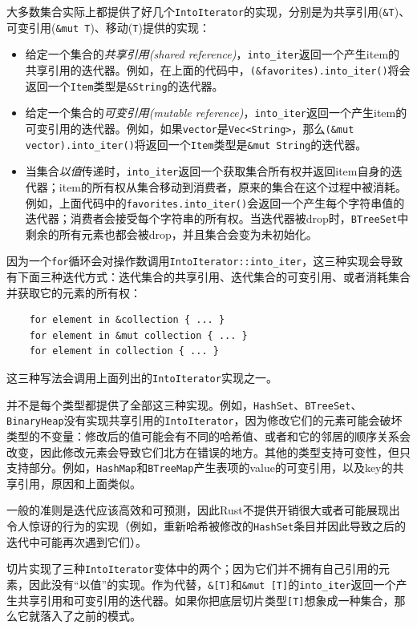 大多数集合实际上都提供了好几个\texttt{IntoIterator}的实现，分别是为共享引用(\texttt{\&T})、可变引用(\texttt{\&mut T})、移动(\texttt{T})提供的实现：
\begin{itemize}
    \item 给定一个集合的\emph{共享引用(shared reference)}，\texttt{into\_iter}返回一个产生item的共享引用的迭代器。例如，在上面的代码中，\texttt{(\&favorites).into\_iter()}将会返回一个\texttt{Item}类型是\texttt{\&String}的迭代器。
    \item 给定一个集合的\emph{可变引用(mutable reference)}，\texttt{into\_iter}返回一个产生item的可变引用的迭代器。例如，如果\texttt{vector}是\texttt{Vec<String>}，那么\texttt{(\&mut vector).into\_iter()}将返回一个\texttt{Item}类型是\texttt{\&mut String}的迭代器。
    \item 当集合\emph{以值}传递时，\texttt{into\_iter}返回一个获取集合所有权并返回item自身的迭代器；item的所有权从集合移动到消费者，原来的集合在这个过程中被消耗。例如，上面代码中的\texttt{favorites.into\_iter()}会返回一个产生每个字符串值的迭代器；消费者会接受每个字符串的所有权。当迭代器被drop时，\texttt{BTreeSet}中剩余的所有元素也都会被drop，并且集合会变为未初始化。
\end{itemize}

因为一个\texttt{for}循环会对操作数调用\texttt{IntoIterator::into\_iter}，这三种实现会导致有下面三种迭代方式：迭代集合的共享引用、迭代集合的可变引用、或者消耗集合并获取它的元素的所有权：
\begin{verbatim}
    for element in &collection { ... }
    for element in &mut collection { ... }
    for element in collection { ... }
\end{verbatim}

这三种写法会调用上面列出的\texttt{IntoIterator}实现之一。

并不是每个类型都提供了全部这三种实现。例如，\texttt{HashSet}、\texttt{BTreeSet}、\texttt{BinaryHeap}没有实现共享引用的\texttt{IntoIterator}，因为修改它们的元素可能会破坏类型的不变量：修改后的值可能会有不同的哈希值、或者和它的邻居的顺序关系会改变，因此修改元素会导致它们北方在错误的地方。其他的类型支持可变性，但只支持部分。例如，\texttt{HashMap}和\texttt{BTreeMap}产生表项的value的可变引用，以及key的共享引用，原因和上面类似。

一般的准则是迭代应该高效和可预测，因此Rust不提供开销很大或者可能展现出令人惊讶的行为的实现（例如，重新哈希被修改的\texttt{HashSet}条目并因此导致之后的迭代中可能再次遇到它们）。

切片实现了三种\texttt{IntoIterator}变体中的两个；因为它们并不拥有自己引用的元素，因此没有“以值”的实现。作为代替，\texttt{\&[T]}和\texttt{\&mut [T]}的\texttt{into\_iter}返回一个产生共享引用和可变引用的迭代器。如果你把底层切片类型\texttt{[T]}想象成一种集合，那么它就落入了之前的模式。

